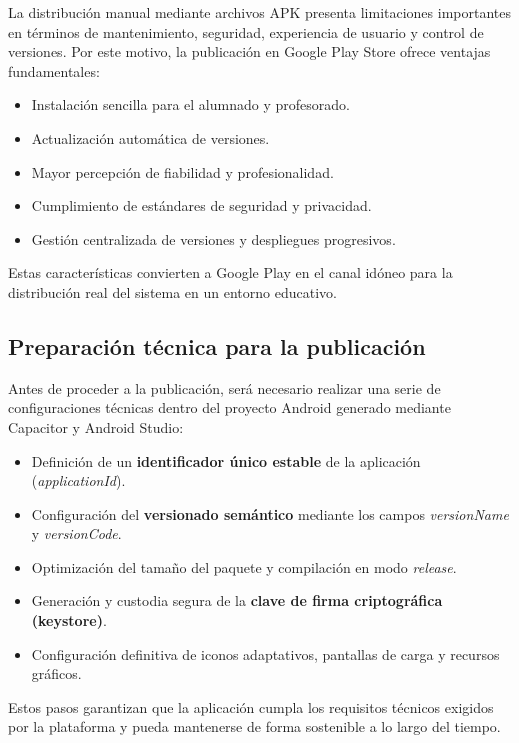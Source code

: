 La distribución manual mediante archivos APK presenta limitaciones importantes en términos de mantenimiento, seguridad, experiencia de usuario y control de versiones. Por este motivo, la publicación en Google Play Store ofrece ventajas fundamentales:

\begin{itemize}
    \item Instalación sencilla para el alumnado y profesorado.
    \item Actualización automática de versiones.
    \item Mayor percepción de fiabilidad y profesionalidad.
    \item Cumplimiento de estándares de seguridad y privacidad.
    \item Gestión centralizada de versiones y despliegues progresivos.
\end{itemize}

Estas características convierten a Google Play en el canal idóneo para la distribución real del sistema en un entorno educativo.

\subsection{Preparación técnica para la publicación}

Antes de proceder a la publicación, será necesario realizar una serie de configuraciones técnicas dentro del proyecto Android generado mediante Capacitor y Android Studio:

\begin{itemize}
    \item Definición de un \textbf{identificador único estable} de la aplicación (\textit{applicationId}).
    \item Configuración del \textbf{versionado semántico} mediante los campos \textit{versionName} y \textit{versionCode}.
    \item Optimización del tamaño del paquete y compilación en modo \textit{release}.
    \item Generación y custodia segura de la \textbf{clave de firma criptográfica (keystore)}.
    \item Configuración definitiva de iconos adaptativos, pantallas de carga y recursos gráficos.
\end{itemize}

Estos pasos garantizan que la aplicación cumpla los requisitos técnicos exigidos por la plataforma y pueda mantenerse de forma sostenible a lo largo del tiempo.

